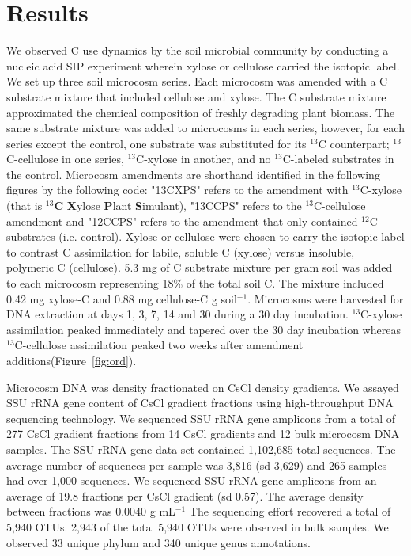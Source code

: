 \section{Results}
We observed C use dynamics by the soil microbial community by conducting a
nucleic acid SIP experiment wherein xylose or cellulose carried the isotopic
label. We set up three soil microcosm series. Each microcosm was amended with
a C substrate mixture that included cellulose and xylose. The C substrate
mixture approximated the chemical composition of freshly degrading plant
biomass. The same substrate mixture was added to microcosms in each series,
however, for each series except the control, one substrate was substituted for
its $^{13}$C counterpart; $^{13}$C-cellulose in one series, $^{13}$C-xylose in
another, and no $^{13}$C-labeled substrates in the control. Microcosm
amendments are shorthand identified in the following figures by the following
code: "13CXPS" refers to the amendment with $^{13}$C-xylose (that is
$^{13}$\textbf{C} \textbf{X}ylose \textbf{P}lant \textbf{S}imulant), "13CCPS"
refers to the $^{13}$C-cellulose amendment and "12CCPS" refers to the amendment
that only contained $^{12}$C substrates (i.e. control). Xylose or cellulose
were chosen to carry the isotopic label to contrast C assimilation for labile,
soluble C (xylose) versus insoluble, polymeric C (cellulose).  5.3 mg of
C substrate mixture per gram soil was added to each microcosm representing 18\%
of the total soil C. The mixture included 0.42 mg xylose-C and 0.88 mg
cellulose-C g soil$^{-1}$. Microcosms were harvested for DNA extraction at days
1, 3, 7, 14 and 30 during a 30 day incubation. $^{13}$C-xylose assimilation
peaked immediately and tapered over the 30 day incubation whereas
$^{13}$C-cellulose assimilation peaked two weeks after amendment
additions(Figure~\ref{fig:ord}). 

Microcosm DNA was density fractionated on CsCl density gradients. We assayed
SSU rRNA gene content of CsCl gradient fractions using high-throughput DNA
sequencing technology. We sequenced SSU rRNA gene amplicons from a total of 277
CsCl gradient fractions from 14 CsCl gradients and 12 bulk microcosm DNA
samples. The SSU rRNA gene data set contained 1,102,685 total sequences. The
average number of sequences per sample was 3,816 (sd 3,629) and 265 samples had
over 1,000 sequences. We sequenced SSU rRNA gene amplicons from an average of
19.8 fractions per CsCl gradient (sd 0.57). The average density between
fractions was  0.0040 g mL$^{-1}$ The sequencing effort recovered a total of
5,940 OTUs. 2,943 of the total 5,940 OTUs were observed in bulk samples. We
observed 33 unique phylum and 340 unique genus annotations.

